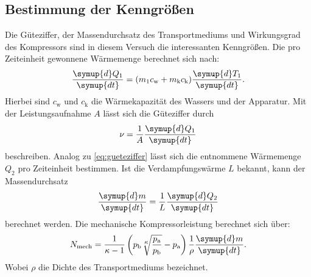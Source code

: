 \subsection{Bestimmung der Kenngrößen}
\label{sec:BdK}
Die Güteziffer, der Massendurchsatz des Transportmediums und Wirkungsgrad des Kompressors sind in diesem Versuch die
interessanten Kenngrößen.
Die pro Zeiteinheit gewonnene Wärmemenge berechnet sich nach:
\begin{equation}
	\frac{\symup{d}Q_1}{\symup{dt}}=(m_1c_{\text{w}}+m_{\text{k}}c_{\text{k}}) \frac{\symup{d}T_1}{\symup{dt}}.
	\label{eq:gueteziffer}
\end{equation}
Hierbei sind $c_{\text{w}}$ und $c_{\text{k}}$ die Wärmekapazität des Wassers und der Apparatur.
Mit der Leistungsaufnahme $A$ lässt sich die Güteziffer durch
\begin{equation}
	\nu=\frac{1}{A}\frac{\symup{d}Q_1}{\symup{dt}}
    \label{eq:leistung}
\end{equation}
beschreiben.
Analog zu \eqref{eq:gueteziffer} lässt sich die entnommene Wärmemenge $Q_2$ pro Zeiteinheit bestimmen.
Ist die Verdampfungswärme $L$ bekannt, kann der Massendurchsatz
\begin{equation}
	\frac{\symup{d}m}{\symup{dt}}=\frac{1}{L}\frac{\symup{d}Q_2}{\symup{dt}}
	\label{eq:massendurchsatz}
\end{equation}
berechnet werden.
Die mechanische Kompressorleistung berechnet sich über:
\begin{equation}
	N_{\text{mech}} = \frac{1}{\kappa - 1} \left( p_{\text{b}} 
        \sqrt[{\leftroot{-1}\uproot{2}\scriptstyle \kappa}]{
        \frac{p_{\text{a}}}{p_{\text{b}}}} -p_{\text{a}}\right) 
        \frac{1}{\rho} 
        \frac{\symup{d}m}{\symup{dt}}.
	\label{eq:arbeit}
\end{equation}
Wobei $\rho$ die Dichte des Transportmediums bezeichnet.
